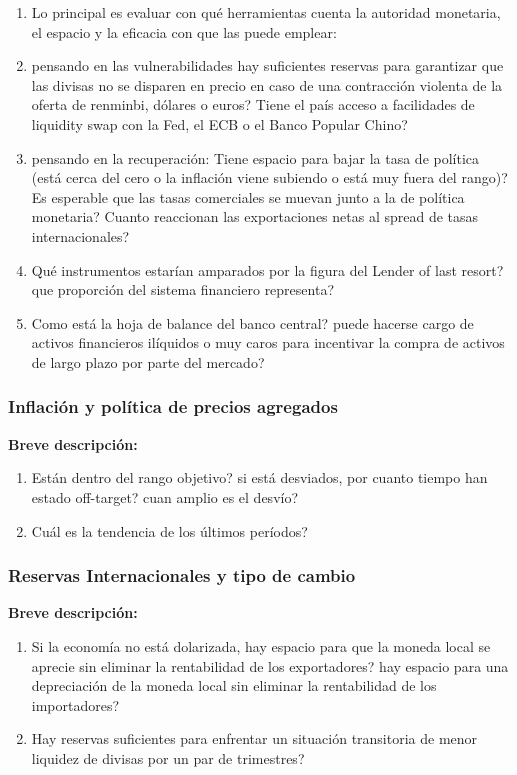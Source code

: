 \documentclass[12pt,a4paper]{article}
\begin{document}
\begin{enumerate}
    \item Lo principal es evaluar con qué herramientas cuenta la autoridad monetaria, el espacio y la eficacia con que las puede emplear: 
    \item pensando en las vulnerabilidades  hay suficientes reservas para garantizar que las divisas no se disparen en precio en caso de una contracción violenta de la oferta de renminbi, dólares o euros? Tiene el país acceso a facilidades de liquidity swap con la Fed, el ECB o el Banco Popular Chino?
    \item pensando en la recuperación: Tiene espacio para bajar la tasa de política (está cerca del cero o la inflación viene subiendo o está muy fuera del rango)? Es esperable que las tasas comerciales se muevan junto a la de política monetaria?	Cuanto reaccionan las exportaciones netas al spread de tasas internacionales?
    \item Qué instrumentos estarían amparados por la figura del Lender of last resort? que proporción del sistema financiero representa?
    \item Como está la hoja de balance del banco central? puede hacerse cargo de activos financieros ilíquidos o muy caros para incentivar la compra de activos de largo plazo por parte del mercado?
\end{enumerate}

\subsubsection{Inflación y política de precios agregados}
\textbf{Breve descripción:} \newline

\begin{enumerate}
	\item Están dentro del rango objetivo? si está desviados, por cuanto tiempo han estado off-target? cuan amplio es el desvío?
	\item Cuál es la tendencia de los últimos períodos?
\end{enumerate}

\subsubsection{Reservas Internacionales y tipo de cambio}
\textbf{Breve descripción:} \newline

\begin{enumerate}
	\item  Si la economía no está dolarizada, hay espacio para que la moneda local se aprecie sin eliminar la rentabilidad de los exportadores? hay espacio para una depreciación de la moneda local sin eliminar la rentabilidad de los importadores?
	\item  Hay reservas suficientes para enfrentar un situación transitoria de menor liquidez de divisas por un par de trimestres?
\end{enumerate}
\end{document}
